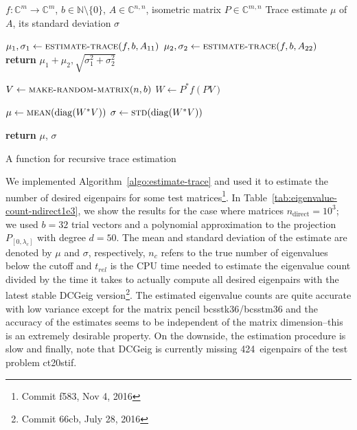 \documentclass[%
	paper=a4,
	fontsize=10pt,
	DIV11,BCOR10mm,
	numbers=noenddot,
	abstract=yes
]{scrartcl}
\newcommand{\F}{\mathbb{C}}
\DeclareMathOperator{\diag}{diag}
\theoremstyle{definition}
\begin{document}
\begin{algorithm}
	\begin{algorithmic}
		\Require
			$f: \F^m \rightarrow \F^m$,
			$b \in \mathbb{N} \setminus \{0\}$,
			$A \in \F^{n,n}$,
			isometric matrix $P \in \F^{m,n}$
		\Ensure
			Trace estimate $\mu$ of $A$,
			its standard deviation $\sigma$

		\Statex
				\State $\mu_1, \sigma_1 \gets
					\textsc{estimate-trace}(f, b, A_{11})$
				\State $\mu_2, \sigma_2 \gets
					\textsc{estimate-trace}(f, b, A_{22})$
				\State
					\textbf{return} $\mu_1+\mu_2, \sqrt{\sigma_1^2+\sigma_2^2}$
			\EndIf

			\Statex
			\State $V \gets \textsc{make-random-matrix}(n, b)$
			\State $W \gets P^* f(P V)$

			\Statex
			\State $\mu \gets \textsc{mean}(\diag(W^* V))$
			\State $\sigma \gets \textsc{std}(\diag(W^* V))$

			\Statex
			\State \textbf{return} $\mu$, $\sigma$
		\EndFunction
	\end{algorithmic}
	\caption{A function for recursive trace estimation}
	\label{algo:estimate-trace}
\end{algorithm}

We implemented Algorithm~\ref{algo:estimate-trace} and used it to estimate the
number of desired eigenpairs for some test matrices\footnote{Commit f583, Nov 4,
2016}. In Table~\ref{tab:eigenvalue-count-ndirect1e3}, we show the results for
the case where matrices $n_{\text{direct}} = 10^3$; we used $b = 32$ trial
vectors and a polynomial approximation to the projection $P_{[0,\lambda_c]}$
with degree $d = 50$. The mean and standard deviation of the estimate are
denoted by $\mu$ and $\sigma$, respectively, $n_c$ refers to the true number of
eigenvalues below the cutoff and $t_{rel}$ is the CPU time needed to estimate
the eigenvalue count divided by the time it takes to actually compute all
desired eigenpairs with the latest stable DCGeig version\footnote{Commit 66cb,
July 28, 2016}. The estimated eigenvalue counts are quite accurate with low
variance except for the matrix pencil bcsstk36/bcsstm36 and the accuracy of the
estimates seems to be independent of the matrix dimension--this is an extremely
desirable property. On the downside, the estimation procedure is slow and
finally, note that DCGeig is currently missing 424~eigenpairs of the test
problem ct20stif.
\end{document}
